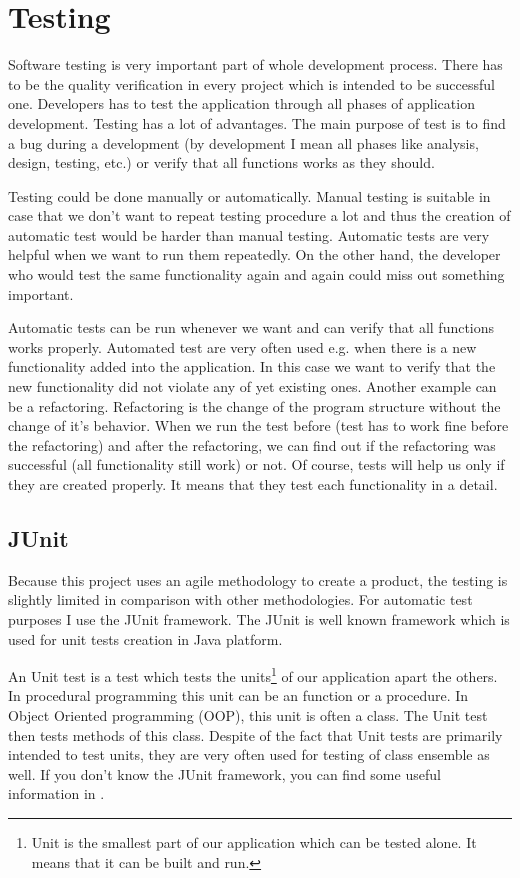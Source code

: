 \chapter{Testing}

Software testing is very important part of whole development process. There has to be the quality verification in every project which is intended to be successful one. Developers has to test the application through all phases of application development. Testing has a lot of advantages. The main purpose of test is to find a bug during a development (by development I mean all phases like analysis, design, testing, etc.) or verify that all functions works as they should. 

Testing could be done manually or automatically. Manual testing is suitable in case that we don't want to repeat testing procedure a lot and thus the creation of automatic test would be harder than manual testing. Automatic tests are very helpful when we want to run them repeatedly. On the other hand, the developer who would test the same functionality again and again could miss out something important.

Automatic tests can be run whenever we want and can verify that all functions works properly. Automated test are very often used e.g. when there is a new functionality added into the application. In this case we want to verify that the new functionality did not violate any of yet existing ones. Another example can be a refactoring. Refactoring is the change of the program structure without the change of it's behavior. When we run the test before (test has to work fine before the refactoring) and after the refactoring, we can find out if the refactoring was successful (all functionality still work) or not. Of course, tests will help us only if they are created properly. It means that they test each functionality in a detail.

\section{JUnit}

Because this project uses an agile methodology to create a product, the testing is slightly limited in comparison with other methodologies. For automatic test purposes I use the JUnit framework. The JUnit is well known framework which is used for unit tests creation in Java platform.

An Unit test is a test which tests the units\footnote{Unit is the smallest part of our application which can be tested alone. It means that it can be built and run.} of our application apart the others. In procedural programming this unit can be an function or a procedure. In Object Oriented programming (OOP), this unit is often a class. The Unit test then tests methods of this class. Despite of the fact that Unit tests are primarily intended to test units, they are very often used for testing of class ensemble as well. If you don't know the JUnit framework, you can find some useful information in \cite{JUnitWeb}.

